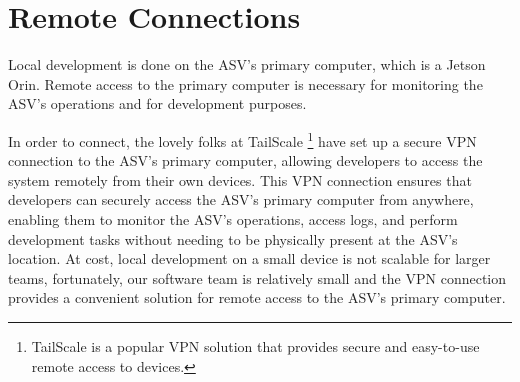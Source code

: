%
%
%
%

\section{Remote Connections}
\label{sec:remote-connections}

Local development is done on the ASV's primary computer, which is a Jetson Orin.
Remote access to the primary computer is necessary for monitoring the ASV's operations and for development purposes.

In order to connect, the lovely folks at TailScale
\footnote{TailScale is a popular VPN solution that provides secure and easy-to-use remote access to devices.}
have set up a secure VPN connection to the ASV's primary computer, allowing developers to access the system remotely from their own devices.
This VPN connection ensures that developers can securely access the ASV's primary computer from anywhere, enabling them to monitor the ASV's operations, access logs, and perform development tasks without needing to be physically present at the ASV's location.
At cost, local development on a small device is not scalable for larger teams, fortunately, our software team is relatively small and the VPN connection provides a convenient solution for remote access to the ASV's primary computer.

